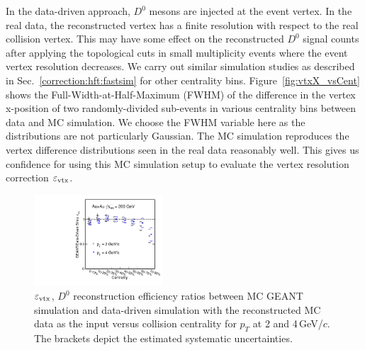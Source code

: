 \documentclass[%
 reprint,	
showpacs,
 amsmath,amssymb,
 aps,
 prc,
]{revtex4-1}
\begin{document}
In the data-driven approach, $D^0$ mesons are injected at the event vertex. In the real data, the reconstructed vertex has a finite resolution with respect to the real collision vertex. This may have some effect on the reconstructed $D^0$ signal counts after applying the topological cuts in small multiplicity events where the event vertex resolution decreases. We carry out similar simulation studies as described in Sec.~\ref{correction:hft:fastsim} for other centrality bins. Figure~\ref{fig:vtxX_vsCent} shows the Full-Width-at-Half-Maximum (FWHM) of the difference in the vertex x-position of two randomly-divided sub-events in various centrality bins between data and MC simulation. We choose the FWHM variable here as the distributions are not particularly Gaussian. The MC simulation reproduces the vertex difference distributions seen in the real data reasonably well. This gives us confidence for using this MC simulation setup to evaluate the vertex resolution correction $\varepsilon_{\rm vtx}$.

\begin{figure}
\centering
\includegraphics[width=0.43\textwidth]{fig/Mcd0Eff_20_80_vsCent.pdf}
\caption{$\varepsilon_{\rm vtx}$, $D^0$ reconstruction efficiency ratios between MC GEANT simulation and data-driven simulation with the reconstructed MC data as the input versus collision centrality for $p_{T}$ at 2 and 4\,GeV/$c$. The brackets depict the estimated systematic uncertainties.}
\label{fig:Mcd0Eff_20_80_vsCent} 
\end{figure}
\end{document}

